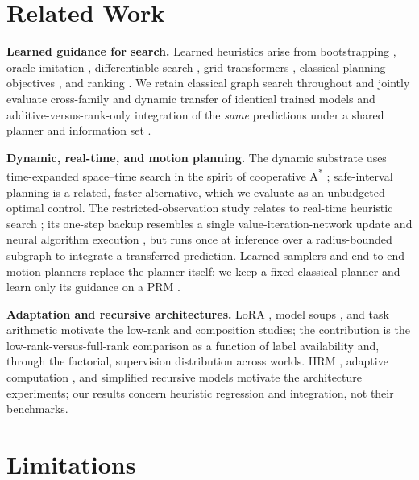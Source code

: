\documentclass[letterpaper]{article} %
\begin{document}
\section{Related Work}

\textbf{Learned guidance for search.} Learned heuristics arise from bootstrapping \citep{arfaee2011bootstrap}, oracle imitation \citep{bhardwaj2017sail}, differentiable search \citep{yonetani2021neuralastar}, grid transformers \citep{kirilenko2023transpath}, classical-planning objectives \citep{ferber2020neural}, and ranking \citep{chrestien2023rank}. We retain classical graph search throughout and jointly evaluate cross-family and dynamic transfer of identical trained models and additive-versus-rank-only integration of the \emph{same} predictions under a shared planner and information set \citep{pohl1970,pearl1982semiadmissible,aine2016mha}.

\textbf{Dynamic, real-time, and motion planning.} The dynamic substrate uses time-expanded space--time search in the spirit of cooperative A\textsuperscript{*} \citep{silver2005cooperative}; safe-interval planning \citep{phillips2011sipp} is a related, faster alternative, which we evaluate as an unbudgeted optimal control. The restricted-observation study relates to real-time heuristic search \citep{korf1990rta,koenig2006rtaa}; its one-step backup resembles a single value-iteration-network update \citep{tamar2016vin,lee2018gppn} and neural algorithm execution \citep{velickovic2021nar}, but runs once at inference over a radius-bounded subgraph to integrate a transferred prediction. Learned samplers and end-to-end motion planners \citep{ichter2018sampling,qureshi2019mpnet} replace the planner itself; we keep a fixed classical planner and learn only its guidance on a PRM \citep{kavraki1996prm}.

\textbf{Adaptation and recursive architectures.} LoRA \citep{hu2021lora}, model soups \citep{wortsman2022soups}, and task arithmetic \citep{ilharco2022task} motivate the low-rank and composition studies; the contribution is the low-rank-versus-full-rank comparison as a function of label availability and, through the factorial, supervision distribution across worlds. HRM \citep{wang2025hrm}, adaptive computation \citep{graves2016act,banino2021pondernet}, and simplified recursive models \citep{jolicoeur2025trm} motivate the architecture experiments; our results concern heuristic regression and integration, not their benchmarks.

\section{Limitations}
\end{document}
